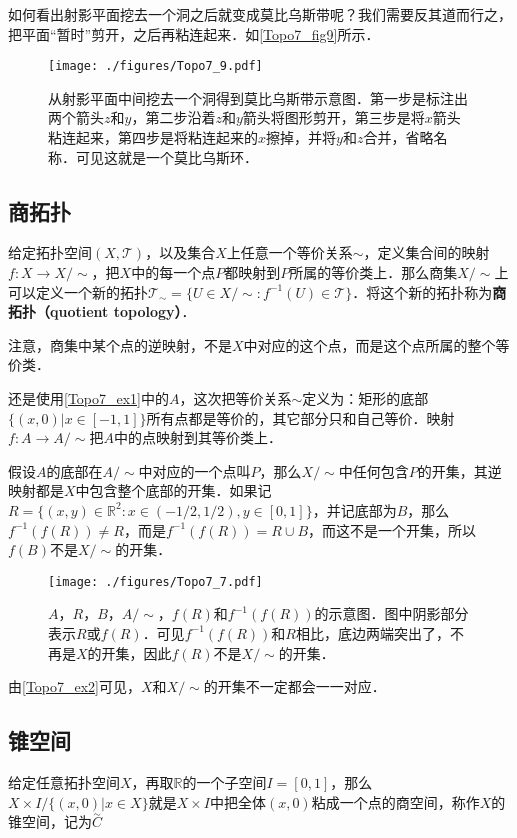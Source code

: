 如何看出射影平面挖去一个洞之后就变成莫比乌斯带呢？我们需要反其道而行之，把平面“暂时”剪开，之后再粘连起来．如\autoref{Topo7_fig9}所示．

\begin{figure}[ht]
\centering
\texttt{[image: ./figures/Topo7\_9.pdf]}
\caption{从射影平面中间挖去一个洞得到莫比乌斯带示意图．第一步是标注出两个箭头$z$和$y$，第二步沿着$z$和$y$箭头将图形剪开，第三步是将$x$箭头粘连起来，第四步是将粘连起来的$x$擦掉，并将$y$和$z$合并，省略名称．可见这就是一个莫比乌斯环．} \label{Topo7_fig9}
\end{figure}

\subsection{商拓扑}

给定拓扑空间$(X, \mathcal{T})$，以及集合$X$上任意一个等价关系$\sim$，定义集合间的映射$f:X\rightarrow X/\sim$，把$X$中的每一个点$P$都映射到$P$所属的等价类上．那么商集$X/\sim$上可以定义一个新的拓扑$\mathcal{T}_\sim=\{U\in X/\sim: f^{-1}(U)\in\mathcal{T}\}$．将这个新的拓扑称为\textbf{商拓扑（quotient topology）}．

注意，商集中某个点的逆映射，不是$X$中对应的这个点，而是这个点所属的整个等价类．

\begin{example}{}\label{Topo7_ex2}

还是使用\autoref{Topo7_ex1}中的$A$，这次把等价关系$\sim$定义为：矩形的底部$\{(x,0)|x\in[-1,1]\}$所有点都是等价的，其它部分只和自己等价．映射$f:A\rightarrow A/\sim$把$A$中的点映射到其等价类上．

假设$A$的底部在$A/\sim$中对应的一个点叫$P$，那么$X/\sim$中任何包含$P$的开集，其逆映射都是$X$中包含整个底部的开集．如果记$R=\{(x,y)\in\mathbb{R}^2:x\in(-1/2,1/2),y\in[0,1]\}$，并记底部为$B$，那么$f^{-1}(f(R))\not=R$，而是$f^{-1}(f(R))=R\cup B$，而这不是一个开集，所以$f(B)$不是$X/\sim$的开集．


\begin{figure}[ht]
\centering
\texttt{[image: ./figures/Topo7\_7.pdf]}
\caption{$A$，$R$，$B$，$A/\sim$，$f(R)$和$f^{-1}(f(R))$的示意图．图中阴影部分表示$R$或$f(R)$．可见$f^{-1}(f(R))$和$R$相比，底边两端突出了，不再是$X$的开集，因此$f(R)$不是$X/\sim$的开集．} \label{Topo7_fig7}
\end{figure}

\end{example}

由\autoref{Topo7_ex2}可见，$X$和$X/\sim$的开集不一定都会一一对应．

\subsection{锥空间}

给定任意拓扑空间$X$，再取$\mathbb{R}$的一个子空间$I=[0,1]$，那么$X\times I/\{(x,0)|x\in X\}$就是$X\times I$中把全体$(x, 0)$粘成一个点的商空间，称作$X$的锥空间，记为$C\limits^\sim$
